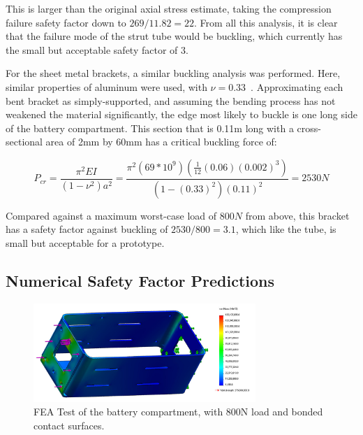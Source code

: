 \documentclass[12pt]{report}
\begin{document}
This is larger than the original axial stress estimate, taking the compression failure safety factor down to $269/11.82 = 22$.
From all this analysis, it is clear that the failure mode of the strut tube would be buckling, which currently has the small but acceptable safety factor of 3.

For the sheet metal brackets, a similar buckling analysis was performed. 
Here, similar properties of aluminum were used, with $\nu = 0.33$~\cite{Aluminum2024_2014}.
Approximating each bent bracket as simply-supported, and assuming the bending process has not weakened the material significantly, the edge most likely to buckle is one long side of the battery compartment.
This section that is 0.11m long with a cross-sectional area of 2mm by 60mm has a critical buckling force \cite{rees2009optimal} of:

\[
P_{cr} = \frac{\pi^2 E I}{(1-\nu^2)a^2} = \frac{ \pi^2 (69*10^9)(\frac{1}{12} (0.06)(0.002)^3)}{(1-(0.33)^2)(0.11)^2} = 2530 N
\]

Compared against a maximum worst-case load of $800N$ from above, this bracket has a safety factor against buckling of $2530/800 = 3.1$, which like the tube, is small but acceptable for a prototype. \\

\subsection{Numerical Safety Factor Predictions}


\begin{figure}[thbt]
  \begin{center}
    \includegraphics[width=0.75\textwidth]{./img/battery_compartment_compression_test_edited.jpg}
    \caption{FEA Test of the battery compartment, with 800N load and bonded contact surfaces.}
    \label{battery_compartment_FEA}
  \end{center}
\end{figure}
\end{document}
